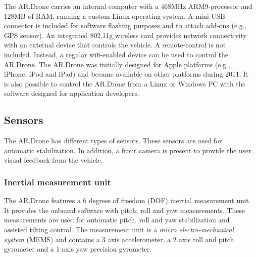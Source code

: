 The AR.Drone carries an internal computer with a 468MHz ARM9-processor and 128MB of RAM, running a custom Linux operating system.
A mini-USB connector is included for software flashing purposes and to attach add-ons (e.g., GPS sensor).
An integrated 802.11g wireless card provides network connectivity with an external device that controls the vehicle.
A remote-control is not included. Instead, a regular wifi-enabled device can be used to control the AR.Drone.
The AR.Drone was initially designed for Apple platforms (e.g., iPhone, iPod and iPad) and became available on other platforms during 2011.
It is also possible to control the AR.Drone from a Linux or Windows PC with the software designed for application developers.



\subsection{Sensors}
The AR.Drone has different types of sensors.
These sensors are used for automatic stabilization.
In addition, a front camera is present to provide the user visual feedback from the vehicle.


\subsubsection{Inertial measurement unit}
The AR.Drone features a 6 degrees of freedom (DOF) inertial measurement unit.
It provides the onboard software with pitch, roll and yaw measurements.
These measurements are used for automatic pitch, roll and yaw stabilization and assisted tilting control.
The measurement unit is a \textit{micro electro-mechanical system} (MEMS) and contains
a 3 axis accelerometer, a 2 axis roll and pitch gyrometer and a 1 axis yaw precision gyrometer.

